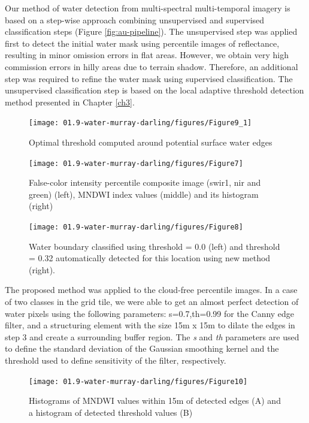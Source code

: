 Our method of water detection from multi-spectral multi-temporal imagery is based on a step-wise approach combining unsupervised and supervised classification steps (Figure \ref{fig:au-pipeline}). The unsupervised step was applied first to detect the initial water mask using percentile images of reflectance, resulting in minor omission errors in flat areas. However, we obtain very high commission errors in hilly areas due to terrain shadow. Therefore, an additional step was required to refine the water mask using supervised classification. The unsupervised classification step is based on the local adaptive threshold detection method presented in Chapter \ref{ch3}. 

\begin{figure}[H]
	\centering
	\texttt{[image: 01.9-water-murray-darling/figures/Figure9\_1]}
	\caption{Optimal threshold computed around potential surface water edges}
\end{figure}

\begin{figure}[H]
	\centering
	\texttt{[image: 01.9-water-murray-darling/figures/Figure7]}
	\caption{False-color intensity percentile composite image (swir1, nir and green) (left), \gls{MNDWI} index values (middle) and its histogram (right)}
\end{figure}

\begin{figure}[H]
	\centering
	\texttt{[image: 01.9-water-murray-darling/figures/Figure8]}
	\caption{Water boundary classified using threshold = 0.0 (left) and threshold = 0.32 automatically detected for this location using new method (right).}
	\label{fig:au_river_water_hist}
\end{figure}

The proposed method was applied to the cloud-free percentile images. In a case of two classes in the grid tile, we were able to get an almost perfect detection of water pixels using the following parameters: s=0.7,th=0.99 for the Canny edge filter, and a structuring element with the size 15m x 15m to dilate the edges in step 3 and create a surrounding buffer region. The \textit{s} and \textit{th} parameters are used to define the standard deviation of the Gaussian smoothing kernel and the threshold used to define sensitivity of the filter, respectively.

\begin{figure}
	\centering
	\texttt{[image: 01.9-water-murray-darling/figures/Figure10]}
	\caption{Histograms of \gls{MNDWI} values within 15m of detected edges (A) and a histogram of detected threshold values (B)}
	\label{fig:au-ndwi-values}
\end{figure}

